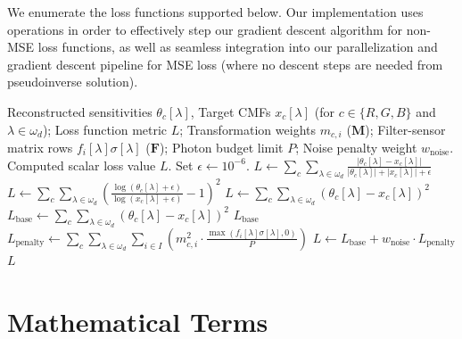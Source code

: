We enumerate the loss functions supported below. Our implementation uses  operations in order to effectively step our gradient descent algorithm for non-MSE loss functions, as well as seamless integration into our parallelization and gradient descent pipeline for MSE loss (where no descent steps are needed from pseudoinverse solution).
\begingroup
\setlength{\textfloatsep}{6pt}
\setlength{\floatsep}{6pt}
\setlength{\intextsep}{6pt}
\begin{algorithm}[H]
\caption{Loss Computation with Noise-Weighting Options}
\label{alg:compute-loss-table}
\begin{algorithmic}[1]
\Require Reconstructed sensitivities $\theta_c[\lambda]$, Target CMFs $x_c[\lambda]$ (for $c \in \{R,G,B\}$ and $\lambda \in \omega_d$); Loss function metric ${L}$; Transformation weights $m_{c,i}$ ($\boldsymbol{M}$); Filter-sensor matrix rows $f_i[\lambda]\sigma[\lambda]$ ($\boldsymbol{F}$); Photon budget limit $P$; Noise penalty weight $w_{\text{noise}}$.
\Ensure Computed scalar loss value $L$.
\State Set $\epsilon \leftarrow 10^{-6}$.
    \State ${L} \leftarrow \sum_{c} \sum_{\lambda \in \omega_d} \frac{|\theta_c[\lambda] - x_c[\lambda]|}{|\theta_c[\lambda]| + |x_c[\lambda]| + \epsilon}$
    \State ${L} \leftarrow \sum_{c} \sum_{\lambda \in \omega_d} \left( \frac{\log(\theta_c[\lambda] + \epsilon)}{\log(x_c[\lambda] + \epsilon)} - 1 \right)^2$
    \State ${L} \leftarrow \sum_{c} \sum_{\lambda \in \omega_d} (\theta_c[\lambda] - x_c[\lambda])^2$
    \State ${L}_{\text{base}} \leftarrow \sum_{c} \sum_{\lambda \in \omega_d} (\theta_c[\lambda] - x_c[\lambda])^2$
        \State \Return ${L}_{\text{base}}$
    \EndIf
    \State ${L}_{\text{penalty}} \leftarrow  \sum_{c} \sum_{\lambda \in \omega_d} \sum_{i \in I} \left( m_{c,i}^2 \cdot \frac{\max(f_i[\lambda]\sigma[\lambda], 0)}{P} \right)$
    \State ${L} \leftarrow {L}_{\text{base}} + w_{\text{noise}} \cdot {L}_{\text{penalty}}$
\EndIf
\State \Return ${L}$
\end{algorithmic}
\end{algorithm}
\endgroup


\section{Mathematical Terms}

